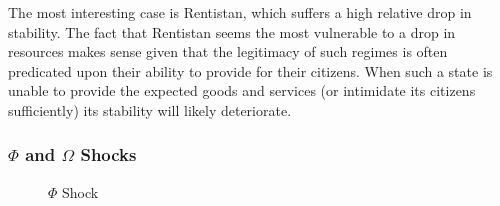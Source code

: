 \documentclass[12pt]{article}
\begin{document}
\begin{spacing}{1.5}

The most interesting case is Rentistan, which suffers a high relative drop in stability. The fact that Rentistan seems the most vulnerable to a drop in resources makes sense given that the legitimacy of such regimes is often predicated upon their ability to provide for their citizens. When such a state is unable to provide the expected goods and services (or intimidate its citizens sufficiently) its stability will likely deteriorate. 

\subsubsection{$\Phi$ and $\Omega$ Shocks} 

\begin{figure}[htb]
\centering 
{} 
\caption{$\Phi$ Shock}


\end{figure}
\end{spacing}
\end{document}

